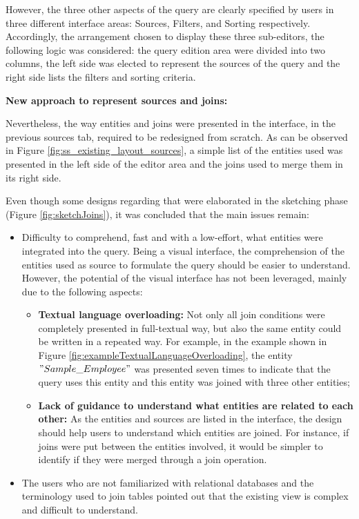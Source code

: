 However, the three other aspects of the query are clearly specified by users in three different interface areas: Sources, Filters, and Sorting respectively. Accordingly, the arrangement chosen to display these three sub-editors, the following logic was considered: the query edition area were divided into two columns, the left side was elected to represent the sources of the query and the right side lists the filters and sorting criteria.

\medskip

\textbf{New approach to represent sources and joins:}

\medskip

Nevertheless, the way entities and joins were presented in the interface, in the previous sources tab, required to be redesigned from scratch. As can be observed in Figure \ref{fig:ss_existing_layout_sources}, a simple list of the entities used was presented in the left side of the editor area and the joins used to merge them in its right side.

Even though some designs regarding that were elaborated in the sketching phase (Figure \ref{fig:sketchJoins}), it was concluded that the main issues remain:

\begin{itemize}
  \item Difficulty to comprehend, fast and with a low-effort, what entities were integrated into the query. Being a visual interface, the comprehension of the entities used as source to formulate the query should be easier to understand. However, the potential of the visual interface has not been leveraged, mainly due to the following aspects:
  \begin{itemize} 
    \item \textbf{Textual language overloading: }Not only all join conditions were completely presented in full-textual way, but also the same entity could be written in a repeated way. For example, in the example shown in Figure \ref{fig:exampleTextualLanguageOverloading}, the entity $"Sample\_Employee"$ was presented seven times to indicate that the query uses this entity and this entity was joined with three other entities;
    \item \textbf{Lack of guidance to understand what entities are related to each other: }As the entities and sources are listed in the interface, the design should help users to understand which entities are joined. For instance, if joins were put between the entities involved, it would be simpler to identify if they were merged through a join operation.
  \end{itemize}
  \item The users who are not familiarized with relational databases and the terminology used to join tables pointed out that the existing view is complex and difficult to understand.
\end{itemize}

